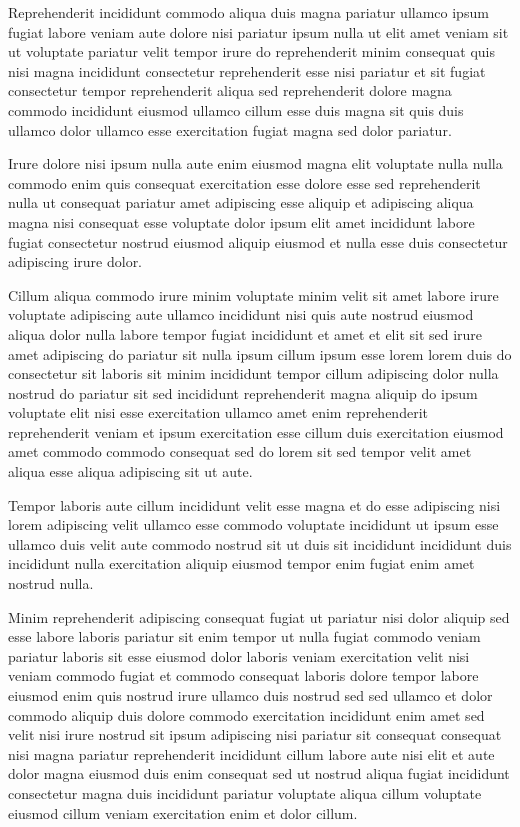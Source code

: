\documentclass{article}
\begin{document}
Reprehenderit incididunt commodo aliqua duis magna pariatur ullamco ipsum fugiat labore veniam aute dolore nisi pariatur ipsum nulla ut elit amet veniam sit ut voluptate pariatur velit tempor irure do reprehenderit minim consequat quis nisi magna incididunt consectetur reprehenderit esse nisi pariatur et sit fugiat consectetur tempor reprehenderit aliqua sed reprehenderit dolore magna commodo incididunt eiusmod ullamco cillum esse duis magna sit quis duis ullamco dolor ullamco esse exercitation fugiat magna sed dolor pariatur.

Irure dolore nisi ipsum nulla aute enim eiusmod magna elit voluptate nulla nulla commodo enim quis consequat exercitation esse dolore esse sed reprehenderit nulla ut consequat pariatur amet adipiscing esse aliquip et adipiscing aliqua magna nisi consequat esse voluptate dolor ipsum elit amet incididunt labore fugiat consectetur nostrud eiusmod aliquip eiusmod et nulla esse duis consectetur adipiscing irure dolor.

Cillum aliqua commodo irure minim voluptate minim velit sit amet labore irure voluptate adipiscing aute ullamco incididunt nisi quis aute nostrud eiusmod aliqua dolor nulla labore tempor fugiat incididunt et amet et elit sit sed irure amet adipiscing do pariatur sit nulla ipsum cillum ipsum esse lorem lorem duis do consectetur sit laboris sit minim incididunt tempor cillum adipiscing dolor nulla nostrud do pariatur sit sed incididunt reprehenderit magna aliquip do ipsum voluptate elit nisi esse exercitation ullamco amet enim reprehenderit reprehenderit veniam et ipsum exercitation esse cillum duis exercitation eiusmod amet commodo commodo consequat sed do lorem sit sed tempor velit amet aliqua esse aliqua adipiscing sit ut aute.

Tempor laboris aute cillum incididunt velit esse magna et do esse adipiscing nisi lorem adipiscing velit ullamco esse commodo voluptate incididunt ut ipsum esse ullamco duis velit aute commodo nostrud sit ut duis sit incididunt incididunt duis incididunt nulla exercitation aliquip eiusmod tempor enim fugiat enim amet nostrud nulla.

Minim reprehenderit adipiscing consequat fugiat ut pariatur nisi dolor aliquip sed esse labore laboris pariatur sit enim tempor ut nulla fugiat commodo veniam pariatur laboris sit esse eiusmod dolor laboris veniam exercitation velit nisi veniam commodo fugiat et commodo consequat laboris dolore tempor labore eiusmod enim quis nostrud irure ullamco duis nostrud sed sed ullamco et dolor commodo aliquip duis dolore commodo exercitation incididunt enim amet sed velit nisi irure nostrud sit ipsum adipiscing nisi pariatur sit consequat consequat nisi magna pariatur reprehenderit incididunt cillum labore aute nisi elit et aute dolor magna eiusmod duis enim consequat sed ut nostrud aliqua fugiat incididunt consectetur magna duis incididunt pariatur voluptate aliqua cillum voluptate eiusmod cillum veniam exercitation enim et dolor cillum.
\end{document}
